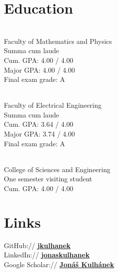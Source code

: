 \documentclass[a4paper]{deedy-resume}
\begin{document}
\lastupdated
{}
\vspace{-0.3cm}

\begin{minipage}[t]{0.33\textwidth} %

\section{Education}
\\
Faculty of Mathematics and Physics\\
Summa cum laude\\
Cum. GPA: 4.00 / 4.00\\
Major GPA: 4.00 / 4.00\\
Final exam grade: A
\sectionspace

\\
Faculty of Electrical Engineering\\
Summa cum laude\\
Cum. GPA: 3.64 / 4.00\\
Major GPA: 3.74 / 4.00\\
Final exam grade: A
\sectionspace

\\

College of Sciences and Engineering\\
One semester visiting student\\
Cum. GPA: 4.00 / 4.00
\sectionspace


\section{Links} 

GitHub:// \href{https://github.com/jkulhanek}{\bf jkulhanek} \\
LinkedIn:// \href{https://www.linkedin.com/in/jonaskulhanek}{\bf jonaskulhanek} \\
Google Scholar:// \href{https://scholar.google.com/citations?user=YDNzfN4AAAAJ}{\bf Jonáš Kulhánek} \\


\end{minipage}
\end{document}
